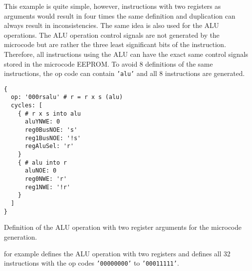 This example is quite simple, however, instructions with two registers as arguments would result in four times the same definition and duplication can always result in inconsistencies.
The same idea is also used for the \gls{ALU} operations.
The \gls{ALU} operation control signals are not generated by the microcode but are rather the three least significant bits of the instruction.
Therefore, all instructions using the \gls{ALU} can have the exact same control signals stored in the microcode \gls{EEPROM}.
To avoid 8 definitions of the same instructions, the op code can contain \texttt{'alu'} and all 8 instructions are generated.
\begin{listing}[h!]
  \begin{verbatim}
{
  op: '000rsalu' # r = r x s (alu)
  cycles: [
    { # r x s into alu
      aluYNWE: 0
      reg0BusNOE: 's'
      reg1BusNOE: '!s'
      regAluSel: 'r'
    }
    { # alu into r
      aluNOE: 0
      reg0NWE: 'r'
      reg1NWE: '!r'
    }
  ]
}
  \end{verbatim}
  \caption{Definition of the \gls{ALU} operation with two register arguments for the microcode generation.}
  \label{lst:mc_aluRS}
\end{listing}
 for example defines the \gls{ALU} operation with two registers and defines all 32 instructions with the op codes \texttt{'00000000'} to \texttt{'00011111'}.

